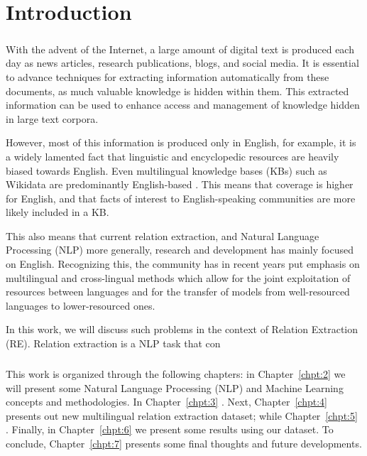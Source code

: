 \chapter{Introduction}
\paragraph{}

With the advent of the Internet, a large amount of digital text is produced each day as news articles, research publications, blogs, and social media. It is essential to advance techniques for extracting information automatically from these documents, as much valuable knowledge is hidden within them. This extracted information can be used to enhance access and management of knowledge hidden in large text corpora. 

However, most of this information is produced only in English, for example, it is a widely lamented fact that linguistic and encyclopedic resources are heavily biased towards English. Even multilingual knowledge bases (KBs) such as Wikidata \citep{vwikidata} are predominantly English-based \citep{Kaffee:Simperl:18}. This means that coverage is higher for English, and that facts of interest to English-speaking communities are more likely included in a KB.

This also means that current relation extraction, and Natural Language Processing (NLP) more generally, research and development has mainly focused on English. Recognizing this, the community has in recent years put emphasis on multilingual and cross-lingual methods which allow for the joint exploitation of resources between languages and for the transfer of models from well-resourced languages to lower-resourced ones.

In this work, we will discuss such problems in the context of Relation Extraction (RE). Relation extraction is a NLP task that con 



\paragraph{}
This work is organized through the following chapters: in Chapter~\ref{chpt:2} we will present some Natural Language Processing (NLP) and Machine Learning concepts and methodologies. In Chapter~\ref{chpt:3} . Next, Chapter~\ref{chpt:4} presents out new multilingual relation extraction dataset; while Chapter~\ref{chpt:5} . Finally, in Chapter~\ref{chpt:6} we present some results using our dataset. To conclude, Chapter~\ref{chpt:7} presents some final thoughts and future developments.